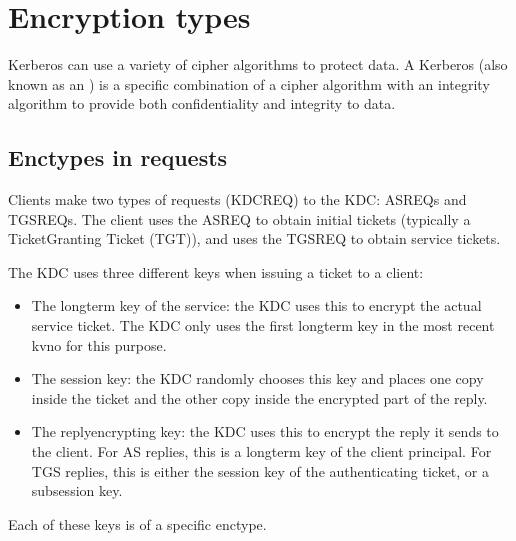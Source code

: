 \documentclass[letterpaper,10pt,english]{sphinxmanual}
\begin{document}
\sphinxstepscope


\chapter{Encryption types}
\label{\detokenize{admin/enctypes:encryption-types}}\label{\detokenize{admin/enctypes:enctypes}}\label{\detokenize{admin/enctypes::doc}}
\sphinxAtStartPar
Kerberos can use a variety of cipher algorithms to protect data.  A
Kerberos  (also known as an ) is a
specific combination of a cipher algorithm with an integrity algorithm
to provide both confidentiality and integrity to data.


\section{Enctypes in requests}
\label{\detokenize{admin/enctypes:enctypes-in-requests}}
\sphinxAtStartPar
Clients make two types of requests (KDC\sphinxhyphen{}REQ) to the KDC: AS\sphinxhyphen{}REQs and
TGS\sphinxhyphen{}REQs.  The client uses the AS\sphinxhyphen{}REQ to obtain initial tickets
(typically a Ticket\sphinxhyphen{}Granting Ticket (TGT)), and uses the TGS\sphinxhyphen{}REQ to
obtain service tickets.

\sphinxAtStartPar
The KDC uses three different keys when issuing a ticket to a client:
\begin{itemize}
\item {} 
\sphinxAtStartPar
The long\sphinxhyphen{}term key of the service: the KDC uses this to encrypt the
actual service ticket.  The KDC only uses the first long\sphinxhyphen{}term key in
the most recent kvno for this purpose.

\item {} 
\sphinxAtStartPar
The session key: the KDC randomly chooses this key and places one
copy inside the ticket and the other copy inside the encrypted part
of the reply.

\item {} 
\sphinxAtStartPar
The reply\sphinxhyphen{}encrypting key: the KDC uses this to encrypt the reply it
sends to the client.  For AS replies, this is a long\sphinxhyphen{}term key of the
client principal.  For TGS replies, this is either the session key of the
authenticating ticket, or a subsession key.

\end{itemize}

\sphinxAtStartPar
Each of these keys is of a specific enctype.
\end{document}
